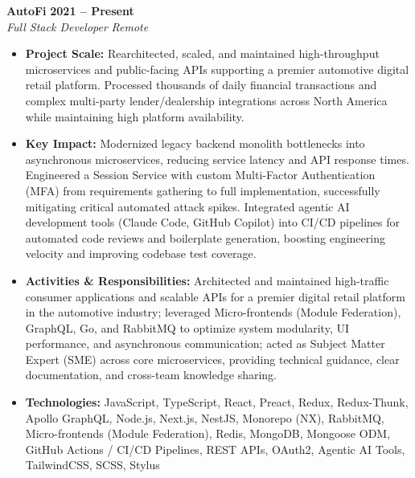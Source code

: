 \documentclass[10pt,a4paper]{article}
\makeatletter
\renewcommand\section{\@startsection{section}{1}{0pt}{12pt}{6pt}{\Large\bfseries\color{primary}}}
\makeatother
\begin{document}
\section{Employment History}

\noindent\textbf{AutoFi} \hfill \textbf{2021 -- Present} \\
\textit{Full Stack Developer} \hfill \textit{Remote}
\begin{itemize}
    \item \textbf{Project Scale:} Rearchitected, scaled, and maintained high-throughput microservices and public-facing APIs supporting a premier automotive digital retail platform. Processed thousands of daily financial transactions and complex multi-party lender/dealership integrations across North America while maintaining high platform availability.
    \item \textbf{Key Impact:} Modernized legacy backend monolith bottlenecks into asynchronous microservices, reducing service latency and API response times. Engineered a Session Service with custom Multi-Factor Authentication (MFA) from requirements gathering to full implementation, successfully mitigating critical automated attack spikes. Integrated agentic AI development tools (Claude Code, GitHub Copilot) into CI/CD pipelines for automated code reviews and boilerplate generation, boosting engineering velocity and improving codebase test coverage.
    \item \textbf{Activities \& Responsibilities:} Architected and maintained high-traffic consumer applications and scalable APIs for a premier digital retail platform in the automotive industry; leveraged Micro-frontends (Module Federation), GraphQL, Go, and RabbitMQ to optimize system modularity, UI performance, and asynchronous communication; acted as Subject Matter Expert (SME) across core microservices, providing technical guidance, clear documentation, and cross-team knowledge sharing.
    \item \textbf{Technologies:} JavaScript, TypeScript, React, Preact, Redux, Redux-Thunk, Apollo GraphQL, Node.js, Next.js, NestJS, Monorepo (NX), RabbitMQ, Micro-frontends (Module Federation), Redis, MongoDB, Mongoose ODM, GitHub Actions / CI/CD Pipelines, REST APIs, OAuth2, Agentic AI Tools, TailwindCSS, SCSS, Stylus
\end{itemize}

\vspace{6pt}
\end{document}
